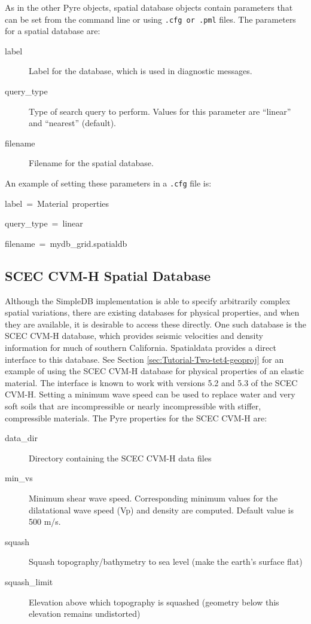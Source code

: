 As in the other Pyre objects, spatial database objects contain parameters
that can be set from the command line or using \texttt{.cfg or .pml}
files. The parameters for a spatial database are:
\begin{description}
\item [{label}] Label for the database, which is used in diagnostic messages.
\item [{query\_type}] Type of search query to perform. Values for this
parameter are ``linear'' and ``nearest'' (default).
\item [{filename}] Filename for the spatial database.
\end{description}
An example of setting these parameters in a \texttt{.cfg} file is:
\begin{lyxcode}
label~=~Material~properties

query\_type~=~linear

filename~=~mydb\_grid.spatialdb


\end{lyxcode}

\subsection{\label{sub:SCECCVMH-Impl}SCEC CVM-H Spatial Database}

Although the SimpleDB implementation is able to specify arbitrarily
complex spatial variations, there are existing databases for physical
properties, and when they are available, it is desirable to access
these directly. One such database is the SCEC CVM-H database, which
provides seismic velocities and density information for much of southern
California. Spatialdata provides a direct interface to this database.
See Section \ref{sec:Tutorial-Two-tet4-geoproj} for an example of
using the SCEC CVM-H database for physical properties of an elastic
material. The interface is known to work with versions 5.2 and 5.3
of the SCEC CVM-H. Setting a minimum wave speed can be used to replace
water and very soft soils that are incompressible or nearly incompressible
with stiffer, compressible materials. The Pyre properties for the
SCEC CVM-H are:
\begin{description}
\item [{data\_dir}] Directory containing the SCEC CVM-H data files
\item [{min\_vs}] Minimum shear wave speed. Corresponding minimum values
for the dilatational wave speed (Vp) and density are computed. Default
value is 500 m/s.
\item [{squash}] Squash topography/bathymetry to sea level (make the earth's
surface flat)
\item [{squash\_limit}] Elevation above which topography is squashed (geometry
below this elevation remains undistorted)
\end{description}

